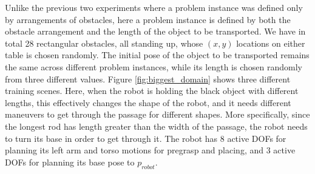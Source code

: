Unlike the previous two experiments where a problem
instance was defined only by arrangements of obstacles,
here a problem instance is defined by both the obstacle arrangement
and the length of the object to be transported. 
We have in total 28 rectangular obstacles, all standing up, whose 
$(x,y)$ locations on either table is chosen randomly. The 
initial pose of the object to be transported remains the same across
different problem instances, while 
its length is chosen randomly from three different values.
Figure \ref{fig:biggest_domain}  shows three different training scenes. 
Here, when the robot is holding the black object with different lengths,
this effectively changes the shape of the robot, and it needs
 different maneuvers
to get through the passage for different shapes. More specifically,
since the longest rod has length greater than the width of
the passage, the robot needs to turn its base in order to get
through it. The robot has 
8 active DOFs for planning its left arm and torso motions 
for pregrasp and placing,
and 3 active DOFs for planning its base pose to $p_{robot}$.

